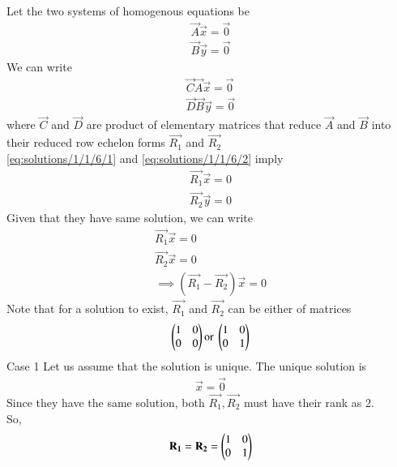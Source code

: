 Let the two systems of homogenous equations be 
\begin{align}
   \vec{A}\vec{x}=\vec{0}\\
 \vec{B}\vec{y}=\vec{0}
\end{align}
We can write
\begin{align}
  \vec{C}\vec{A}\vec{x}=\vec{0}\label{eq:solutions/1/1/6/1}\\
 \vec{D}\vec{B}\vec{y}=\vec{0}\label{eq:solutions/1/1/6/2}
\end{align}
where $\vec{C}$ and $\vec{D}$ are product of elementary matrices that reduce $\vec{A}$ and $\vec{B}$ into their reduced row echelon forms $\vec{R_1}$ and $\vec{R_2}$\\
\eqref{eq:solutions/1/1/6/1} and \eqref{eq:solutions/1/1/6/2} imply
\begin{align}
    \vec{R_1}\vec{x}=0\\
     \vec{R_2}\vec{y}=0
\end{align}
Given that they have same solution, we can write
\begin{align}
     \vec{R_1}\vec{x}=0\label{eq:solutions/1/1/6/3}\\
     \vec{R_2}\vec{x}=0\label{eq:solutions/1/1/6/4}\\
     \implies (\vec{R_1}-\vec{R_2})\vec{x}=0\label{eq:solutions/1/1/6/5}
\end{align}
Note that for a solution to exist, $\vec{R_1}$ and $\vec{R_2}$ can be either of matrices
\begin{align}
    \begin{pmatrix}1&0\\0&0\end{pmatrix} \text{or } \begin{pmatrix}1&0\\0&1\end{pmatrix}
\end{align}
{Case 1}
Let us assume that the solution is unique.
The unique solution is
\begin{align}
    \vec{x}=\vec{0}
\end{align}
Since they have the same solution, both $\vec{R_1},\vec{R_2}$ must have their rank as 2.\\
So,
\begin{align}
    \mathbf{R_1}=\mathbf{R_2}=\begin{pmatrix}1&0\\0&1\end{pmatrix}
\end{align}

